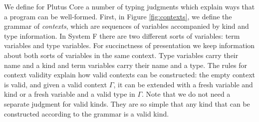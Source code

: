 \documentclass[a4paper]{article}
\begin{document}
We define for Plutus Core a number of typing judgments which explain
ways that a program can be well-formed. First, in Figure
\ref{fig:contexts}, we define the grammar of \textit{contexts},
which are sequences of variables accompanied by kind and type
information. In System F there are two different sorts of variables:
term variables and type variables. For succinctness of presentation we
keep information about both sorts of variables in the same
context. Type variables carry their name and a kind and term variables
carry their name and a type. The rules for context validity explain
how valid contexts can be constructed: the empty context is valid, and
given a valid context $\Gamma$, it can be extended with a fresh
variable and kind or a fresh variable and a valid type in
$\Gamma$. Note that we do not need a separate judgment for valid
kinds. They are so simple that any kind that can be constructed
according to the grammar is a valid kind.


\end{document}
